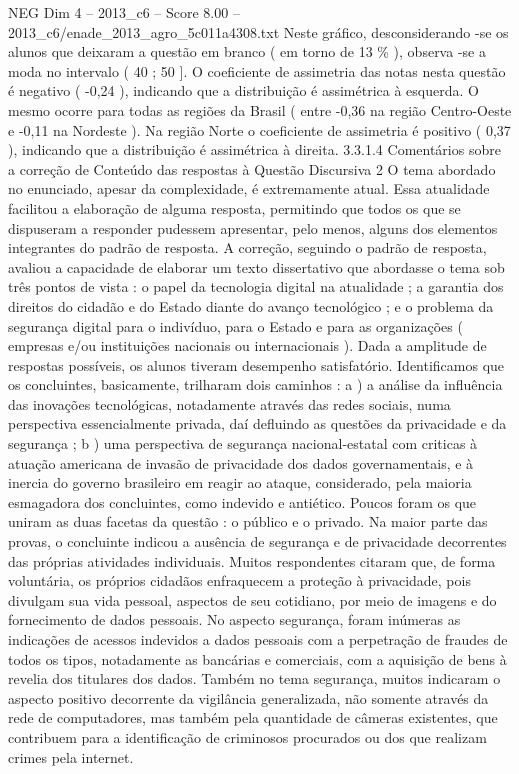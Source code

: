 \begin{textsample}{NEG Dim 4 – 2013\_c6 – Score 8.00 – 2013\_c6/enade\_2013\_agro\_5c011a4308.txt}
Neste gráfico, desconsiderando -se os alunos que deixaram a questão em branco ( em torno de 13 \% ), observa -se a moda no intervalo ( 40 ; 50 ].
O coeficiente de assimetria das notas nesta questão é negativo ( -0,24 ), indicando que a distribuição é assimétrica à esquerda.
O mesmo ocorre para todas as regiões da Brasil ( entre -0,36 na região Centro-Oeste e -0,11 na Nordeste ).
Na região Norte o coeficiente de assimetria é positivo ( 0,37 ), indicando que a distribuição é assimétrica à direita. 3.3.1.4 Comentários sobre a correção de Conteúdo das respostas à Questão Discursiva 2 O tema abordado no enunciado, apesar da complexidade, é extremamente atual.
Essa atualidade facilitou a elaboração de alguma resposta, permitindo que todos os que se dispuseram a responder pudessem apresentar, pelo menos, alguns dos elementos integrantes do padrão de resposta.
A correção, seguindo o padrão de resposta, avaliou a capacidade de elaborar um texto dissertativo que abordasse o tema sob três pontos de vista : o papel da tecnologia digital na atualidade ; a garantia dos direitos do cidadão e do Estado diante do avanço tecnológico ; e o problema da segurança digital para o indivíduo, para o Estado e para as organizações ( empresas e/ou instituições nacionais ou internacionais ).
Dada a amplitude de respostas possíveis, os alunos tiveram desempenho satisfatório.
Identificamos que os concluintes, basicamente, trilharam dois caminhos : a ) a análise da influência das inovações tecnológicas, notadamente através das redes sociais, numa perspectiva essencialmente privada, daí defluindo as questões da privacidade e da segurança ; b ) uma perspectiva de segurança nacional-estatal com criticas à atuação americana de invasão de privacidade dos dados governamentais, e à inercia do governo brasileiro em reagir ao ataque, considerado, pela maioria esmagadora dos concluintes, como indevido e antiético.
Poucos foram os que uniram as duas facetas da questão : o público e o privado.
Na maior parte das provas, o concluinte indicou a ausência de segurança e de privacidade decorrentes das próprias atividades individuais.
Muitos respondentes citaram que, de forma voluntária, os próprios cidadãos enfraquecem a proteção à privacidade, pois divulgam sua vida pessoal, aspectos de seu cotidiano, por meio de imagens e do fornecimento de dados pessoais.
No aspecto segurança, foram inúmeras as indicações de acessos indevidos a dados pessoais com a perpetração de fraudes de todos os tipos, notadamente as bancárias e comerciais, com a aquisição de bens à revelia dos titulares dos dados.
Também no tema segurança, muitos indicaram o aspecto positivo decorrente da vigilância generalizada, não somente através da rede de computadores, mas também pela quantidade de câmeras existentes, que contribuem para a identificação de criminosos procurados ou dos que realizam crimes pela internet.

\end{textsample}
